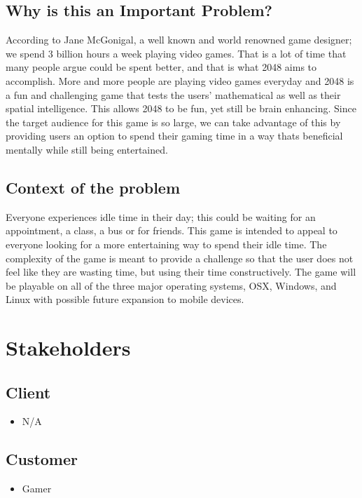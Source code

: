 \subsection{Why is this an Important Problem?} 
\par\indent\indent According to Jane McGonigal, a well known and world renowned game designer; we spend 3 
billion hours a week playing video games. That is a lot of time that many people argue could be spent better, and 
that is what 2048 aims to accomplish. More and more people are playing video games everyday and 2048 is a 
fun and challenging game that tests the users' mathematical as well as their spatial intelligence. This allows 2048 
to be fun, yet still be brain enhancing. Since the target audience for this game is so large, we can take advantage 
of this by providing users an option to spend their gaming time in a way thats beneficial mentally while still being 
entertained.
\subsection{Context of the problem} 
\par\indent\indent Everyone experiences idle time in their day; this could be waiting for an appointment, a class, a 
bus or for friends. This game is intended to appeal to everyone looking for a more entertaining way to spend their 
idle time. The complexity of the game is meant to provide a challenge so that the user does not feel like they are 
wasting time, but using their time constructively. The game will be playable on all of the three major operating 
systems, OSX, Windows, and Linux with possible future expansion to mobile devices.

\section{Stakeholders}
\subsection{Client}
\begin{itemize}
\item N/A
\end{itemize}
\subsection{Customer}
\begin{itemize}
\item Gamer
\end{itemize}
